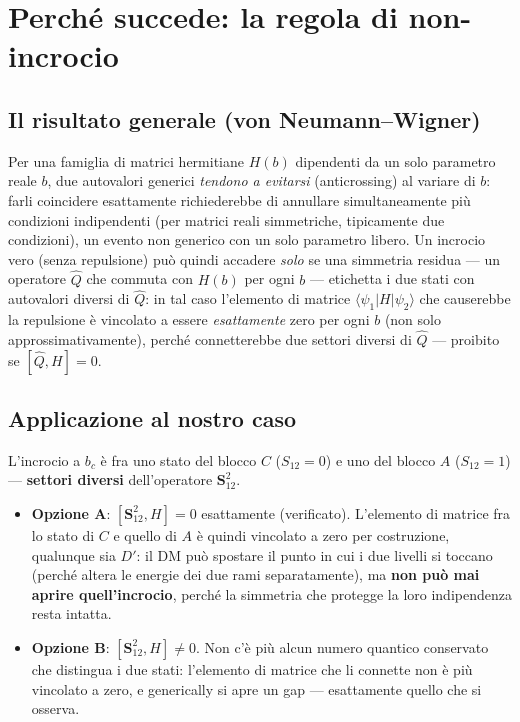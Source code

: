 \documentclass[11pt,a4paper]{article}
\theoremstyle{remark}
\begin{document}
\section{Perché succede: la regola di non-incrocio}

\subsection{Il risultato generale (von Neumann--Wigner)}

Per una famiglia di matrici hermitiane $H(b)$ dipendenti da un solo parametro reale
$b$, due autovalori generici \emph{tendono a evitarsi} (anticrossing) al variare di
$b$: farli coincidere esattamente richiederebbe di annullare simultaneamente più
condizioni indipendenti (per matrici reali simmetriche, tipicamente due condizioni),
un evento non generico con un solo parametro libero. Un incrocio vero (senza
repulsione) può quindi accadere \emph{solo} se una simmetria residua — un operatore
$\hat Q$ che commuta con $H(b)$ per ogni $b$ — etichetta i due stati con autovalori
diversi di $\hat Q$: in tal caso l'elemento di matrice $\langle\psi_1|H|\psi_2\rangle$
che causerebbe la repulsione è vincolato a essere \emph{esattamente} zero per ogni
$b$ (non solo approssimativamente), perché connetterebbe due settori diversi di
$\hat Q$ — proibito se $[\hat Q,H]=0$.

\subsection{Applicazione al nostro caso}

L'incrocio a $b_c$ è fra uno stato del blocco $C$ ($S_{12}=0$) e uno del blocco $A$
($S_{12}=1$) — \textbf{settori diversi} dell'operatore $\mathbf S_{12}^2$.

\begin{itemize}[leftmargin=1.4em]
\item \textbf{Opzione A}: $[\mathbf S_{12}^2, H]=0$ esattamente (verificato). L'elemento
di matrice fra lo stato di $C$ e quello di $A$ è quindi vincolato a zero per
costruzione, qualunque sia $D'$: il DM può spostare il punto in cui i due livelli si
toccano (perché altera le energie dei due rami separatamente), ma \textbf{non può mai
aprire quell'incrocio}, perché la simmetria che protegge la loro indipendenza resta
intatta.
\item \textbf{Opzione B}: $[\mathbf S_{12}^2,H]\neq0$. Non c'è più alcun numero
quantico conservato che distingua i due stati: l'elemento di matrice che li connette
non è più vincolato a zero, e generically si apre un gap — esattamente quello che si
osserva.
\end{itemize}
\end{document}
